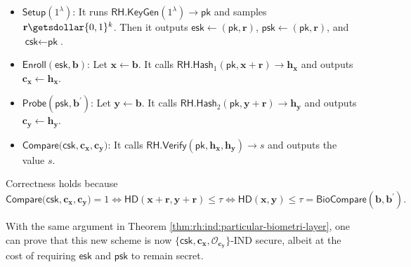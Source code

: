 \begin{itemize}

	\item $\textsf{Setup}(1^\lambda)$: It runs $\textsf{RH.KeyGen}(1^\lambda) \to \textsf{pk}$ and samples $\mathbf{r} \getsdollar \{0, 1\}^k$. Then it outputs $\textsf{esk} \gets (\textsf{pk}, \mathbf{r})$, $\textsf{psk} \gets (\textsf{pk}, \mathbf{r})$, and $\textsf{csk} \gets \textsf{pk}$.

	\item $\textsf{Enroll}(\textsf{esk}, \mathbf{b})$: Let $\mathbf{x} \gets \mathbf{b}$. It calls $\textsf{RH.Hash}_1(\textsf{pk}, \mathbf{x} + \mathbf{r}) \to \mathbf{h_x}$ and outputs $\mathbf{c_x} \gets \mathbf{h_x}$.

	\item $\textsf{Probe}(\textsf{psk}, \mathbf{b}^\prime)$: Let $\mathbf{y} \gets \mathbf{b}$. It calls $\textsf{RH.Hash}_2(\textsf{pk}, \mathbf{y} + \mathbf{r}) \to \mathbf{h_y}$ and outputs $\mathbf{c_y} \gets \mathbf{h_y}$.

	\item $\textsf{Compare}(\textsf{csk}, \mathbf{c_x}, \mathbf{c_y)}$: It calls $\textsf{RH.Verify}(\textsf{pk}, \mathbf{h_x}, \mathbf{h_y}) \to s$ and outputs the value $s$.

\end{itemize}
Correctness holds because
\[
	\textsf{Compare}(\textsf{csk}, \mathbf{c_x}, \mathbf{c_y)} = 1 \Leftrightarrow \textsf{HD}(\mathbf{x} + \mathbf{r}, \mathbf{y} + \mathbf{r}) \leq \tau \Leftrightarrow \textsf{HD}(\mathbf{x}, \mathbf{y}) \leq \tau = \textsf{BioCompare}(\mathbf{b}, \mathbf{b}^\prime).
\]

With the same argument in Theorem \ref{thm:rh:ind:particular-biometri-layer}, one can prove that this new scheme is now $\{\textsf{csk}, \mathbf{c_x}, \mathcal{O}_{\mathbf{c_y}}\}$-IND secure, albeit at the cost of requiring $\textsf{esk}$ and $\textsf{psk}$ to remain secret.
